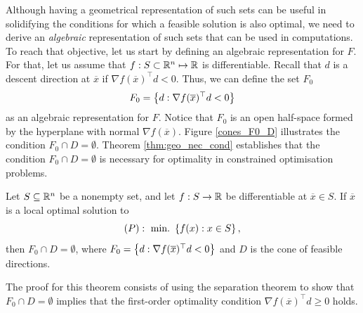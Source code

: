 Although having a geometrical representation of such sets can be useful in solidifying the conditions for which a feasible solution is also optimal, we need to derive an \emph{algebraic} representation of such sets that can be used in computations. To reach that objective, let us start by defining an algebraic representation for $F$. For that, let us assume that $f : S \subset \mathbb{R}^n \mapsto \mathbb{R}$ is differentiable. Recall that $d$ is a descent direction at $\overline{x}$ if $\nabla f(\overline{x})^\top d < 0$. Thus, we can define the set $F_0$
%
\begin{align*}
	F_0 = \left\{ d : \nabla f(\overline{x})^\top d < 0 \right \}	
\end{align*}
%
as an algebraic representation for $F$. Notice that $F_0$ is an open half-space formed by the hyperplane with normal $\nabla f(\overline{x})$. Figure \ref{cones_F0_D} illustrates the condition $F_0 \cap D = \emptyset$.
Theorem \ref{thm:geo_nec_cond} establishes that the condition $F_0 \cap D = \emptyset$ is necessary for optimality in constrained optimisation problems.
%
\begin{theorem}\label{thm:geo_nec_cond}
Let $S \subseteq \mathbb{R}^n$ be a nonempty set, and let $f:S \rightarrow \mathbb{R}$ be differentiable at $\overline{x} \in S$. If $\overline{x}$ is a local optimal solution to\\[-10pt]
$$(P) :~ \mathop{\text{min.~}}\left\{ f(x) : x \in S \right \},$$ 
then $F_0 \cap D = \emptyset$, where $F_0 = \left\{ d : \nabla f(\overline{x})^\top d < 0 \right \}$ and $D$ is the cone of feasible directions.
\end{theorem}
%
The proof for this theorem consists of using the separation theorem to show that $F_0 \cap D = \emptyset$ implies that the first-order optimality condition $\nabla f(\overline{x})^\top d \geq 0$ holds.
%

